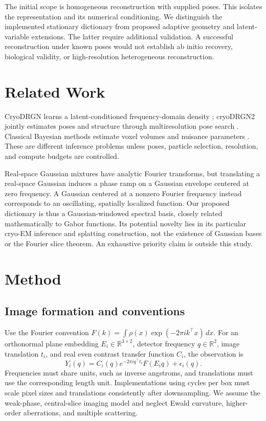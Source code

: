 \documentclass{article}
\newcommand{\R}{\mathbb{R}}
\begin{document}
The initial scope is homogeneous reconstruction with supplied poses. This isolates the representation and its numerical conditioning. We distinguish the implemented stationary dictionary from proposed adaptive geometry and latent-variable extensions. The latter require additional validation. A successful reconstruction under known poses would not establish ab initio recovery, biological validity, or high-resolution heterogeneous reconstruction.

\section{Related Work}
CryoDRGN learns a latent-conditioned frequency-domain density \citep{zhong2021}; cryoDRGN2 jointly estimates poses and structure through multiresolution pose search \citep{zhong2021b}. Classical Bayesian methods estimate voxel volumes and nuisance parameters \citep{scheres2012}. These are different inference problems unless poses, particle selection, resolution, and compute budgets are controlled.

Real-space Gaussian mixtures have analytic Fourier transforms, but translating a real-space Gaussian induces a phase ramp on a Gaussian envelope centered at zero frequency. A Gaussian centered at a nonzero Fourier frequency instead corresponds to an oscillating, spatially localized function. Our proposed dictionary is thus a Gaussian-windowed spectral basis, closely related mathematically to Gabor functions. Its potential novelty lies in its particular cryo-EM inference and splatting construction, not the existence of Gaussian bases or the Fourier slice theorem. An exhaustive priority claim is outside this study.

\section{Method}
\subsection{Image formation and conventions}
Use the Fourier convention $F(k)=\int \rho(x)\exp(-2\pi i k^\top x)\,dx$. For an orthonormal plane embedding $E_i\in\R^{3\times2}$, detector frequency $q\in\R^2$, image translation $t_i$, and real even contrast transfer function $C_i$, the observation is
\begin{equation}\label{eq:forward}
Y_i(q)=C_i(q)e^{-2\pi i q^\top t_i}F(E_iq)+\epsilon_i(q).
\end{equation}
Frequencies must share units, such as inverse angstroms, and translations must use the corresponding length unit. Implementations using cycles per box must scale pixel sizes and translations consistently after downsampling. We assume the weak-phase, central-slice imaging model and neglect Ewald curvature, higher-order aberrations, and multiple scattering.
\end{document}
